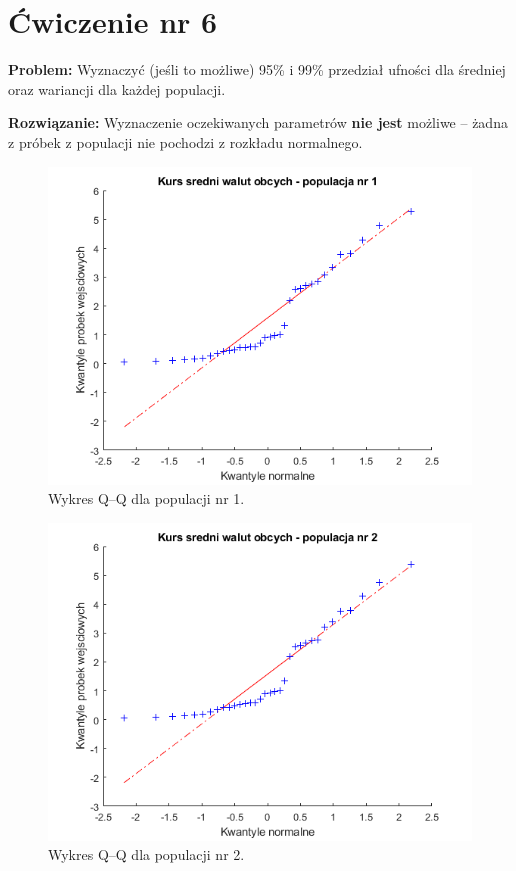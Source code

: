 \documentclass[12pt, a4paper]{article}
\begin{document}
\section*{Ćwiczenie nr 6}
\begin{hangparas}{2.1cm}{1}
  \textbf{Problem:} Wyznaczyć (jeśli to możliwe) 95\% i 99\% przedział ufności dla średniej oraz wariancji dla każdej populacji.\newline
\end{hangparas}

\begin{hangparas}{2.85cm}{1}
\textbf{Rozwiązanie:} Wyznaczenie oczekiwanych parametrów \textbf{nie jest} możliwe -- żadna z próbek z populacji nie pochodzi z rozkładu normalnego.\newline
\end{hangparas}

\begin{figure}[H]
\centering
\includegraphics[width=.75\textwidth]{qqplot1.png}
\caption{Wykres Q--Q dla populacji nr 1.}
\label{fig:c61}
\end{figure}

\begin{figure}[H]
\centering
\includegraphics[width=.75\textwidth]{qqplot2.png}
\caption{Wykres Q--Q dla populacji nr 2.}
\label{fig:c62}
\end{figure}
\end{document}
